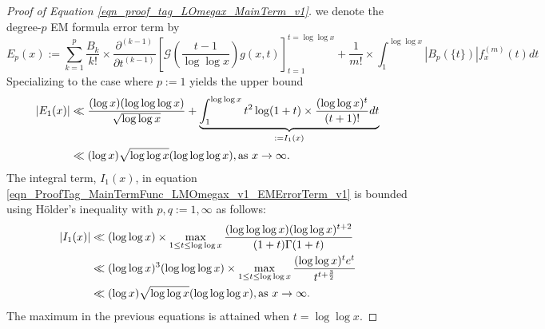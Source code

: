 \documentclass[11pt,reqno,a4letter]{article}
\numberwithin{equation}{section}
\numberwithin{figure}{section}
\numberwithin{table}{section}
\theoremstyle{plain}
\numberwithin{theorem}{section}
\theoremstyle{definition}
\theoremstyle{remark}
\newcommand{\mathtext}[1]{\text{\rm #1}}
\begin{document}
\begin{proof}[Proof of Equation \eqref{eqn_proof_tag_LOmegax_MainTerm_v1}]
we denote the degree-$p$ EM formula error term by 
$$E_p(x) := \sum\limits_{k=1}^{p} \frac{B_k}{k!} \times \frac{\partial^{(k-1)}}{\partial t^{(k-1)}} 
	\left[\mathcal{G}\left(\frac{t-1}{\log\log x}\right) g(x, t) 
     \right]_{t=1}^{t=\log\log x} + \frac{1}{m!} \times 
     \int_1^{\log\log x} \left\lvert B_p(\{t\}) \right\rvert f_x^{(m)}(t) dt$$ 
Specializing to the case where $p := 1$ yields the upper bound 
\begin{align}
\label{eqn_ProofTag_MainTermFunc_LMOmegax_v1_EMErrorTerm_v1}
\left\lvert E_1(x) \right\rvert & \ll \frac{(\log x) (\log\log\log x)}{\sqrt{\log\log x}} + 
     \underset{:= I_1(x)}{\underbrace{\int_1^{\log\log x} t^2 \log(1+t) 
     \times \frac{(\log\log x)^t}{(t+1)!} dt}} \\ 
\notag
     & \ll (\log x) \sqrt{\log\log x} (\log\log\log x), 
     \mathtext{ as } x \rightarrow \infty. 
\end{align}
The integral term, $I_1(x)$, in equation 
\eqref{eqn_ProofTag_MainTermFunc_LMOmegax_v1_EMErrorTerm_v1} is 
bounded using H\"older's inequality with $p, q := 1, \infty$ as follows: 
\begin{align}
\notag
\left\lvert I_1(x) \right\rvert & \ll (\log\log x) \times \max_{1 \leq t \leq \log\log x} 
     \frac{(\log\log\log x) (\log\log x)^{t+2}}{(1 + t) \Gamma(1 + t)} \\ 
\notag 
     & \ll (\log\log x)^3 (\log\log\log x) \times \max_{1 \leq t \leq \log\log x} 
     \frac{(\log\log x)^t e^t}{t^{t+\frac{3}{2}}} \\ 
\label{eqn_ProofTag_MainTermFunc_LMOmegax_v1_EMErrorTerm_v2}
     & \ll (\log x) \sqrt{\log\log x} (\log\log\log x), 
     \mathtext{ as } x \rightarrow \infty. 
\end{align}
The maximum in the previous equations is attained when $t = \log\log x$. 


\end{proof}
\end{document}
